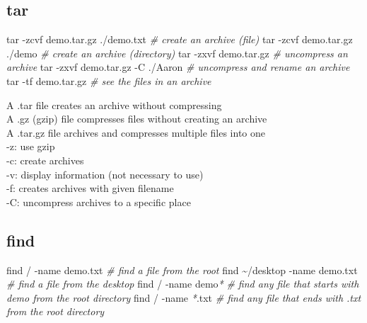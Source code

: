 \documentclass[
]{book}
\newenvironment{Shaded}{\begin{snugshade}}{\end{snugshade}}
\newcommand{\AttributeTok}[1]{\textcolor[rgb]{0.77,0.63,0.00}{#1}}
\newcommand{\CommentTok}[1]{\textcolor[rgb]{0.56,0.35,0.01}{\textit{#1}}}
\newcommand{\FunctionTok}[1]{\textcolor[rgb]{0.00,0.00,0.00}{#1}}
\newcommand{\NormalTok}[1]{#1}
\newcommand{\PreprocessorTok}[1]{\textcolor[rgb]{0.56,0.35,0.01}{\textit{#1}}}
\begin{document}
\hypertarget{tar}{%
\subsection*{tar}\label{tar}}

\begin{Shaded}
\begin{Highlighting}[]
\FunctionTok{tar} \AttributeTok{{-}zcvf}\NormalTok{ demo.tar.gz ./demo.txt }\CommentTok{\# create an archive (file)}
\FunctionTok{tar} \AttributeTok{{-}zcvf}\NormalTok{ demo.tar.gz ./demo }\CommentTok{\# create an archive (directory)}
\FunctionTok{tar} \AttributeTok{{-}zxvf}\NormalTok{ demo.tar.gz }\CommentTok{\# uncompress an archive}
\FunctionTok{tar} \AttributeTok{{-}zxvf}\NormalTok{ demo.tar.gz }\AttributeTok{{-}C}\NormalTok{ ./Aaron }\CommentTok{\# uncompress and rename an archive}
\FunctionTok{tar} \AttributeTok{{-}tf}\NormalTok{ demo.tar.gz }\CommentTok{\# see the files in an archive}
\end{Highlighting}
\end{Shaded}

A .tar file creates an archive without compressing\\
A .gz (gzip) file compresses files without creating an archive\\
A .tar.gz file archives and compresses multiple files into one\\
-z: use gzip\\
-c: create archives\\
-v: display information (not necessary to use)\\
-f: creates archives with given filename\\
-C: uncompress archives to a specific place

\hypertarget{find}{%
\subsection*{find}\label{find}}

\begin{Shaded}
\begin{Highlighting}[]
\FunctionTok{find}\NormalTok{ / }\AttributeTok{{-}name}\NormalTok{ demo.txt }\CommentTok{\# find a file from the root}
\FunctionTok{find}\NormalTok{ \textasciitilde{}/desktop }\AttributeTok{{-}name}\NormalTok{ demo.txt }\CommentTok{\# find a file from the desktop}
\FunctionTok{find}\NormalTok{ / }\AttributeTok{{-}name}\NormalTok{ demo}\PreprocessorTok{*} \CommentTok{\# find any file that starts with demo from the root directory}
\FunctionTok{find}\NormalTok{ / }\AttributeTok{{-}name} \PreprocessorTok{*}\NormalTok{.txt }\CommentTok{\# find any file that ends with .txt from the root directory}
\end{Highlighting}
\end{Shaded}
\end{document}
